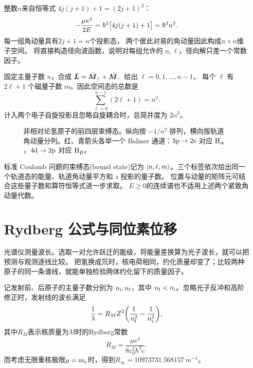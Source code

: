 整数$n$来自恒等式
$4j(j + 1) + 1 = (2j + 1)^2$：
\[
    -\frac{\mu\kappa^2}{2E}
    = \hbar^2\bigl[4j(j + 1) + 1\bigr]
    = \hbar^2n^2.
\]
每一组角动量具有$2j + 1 = n$个投影态，
两个彼此对易的角动量因此构成$n \times n$维子空间。
将直接构造径向波函数，说明对每组允许的 $n,\ell$，径向解只差一个常数因子。

\begin{corollary}[氢原子束缚能级的简并度]
固定主量子数 $n$，合成 $\hat{\bm{L}} = \hat{\bm{M}}_+ + \hat{\bm{M}}_-$ 给出 $\ell = 0,1,\ldots,n - 1$，
每个 $\ell$ 有 $2\ell + 1$ 个磁量子数 $m$。因此空间态的总数是
\begin{equation}
    \sum_{\ell=0}^{n-1}(2\ell + 1) = n^2.
\end{equation}
计入两个电子自旋投影且忽略自旋耦合时，总简并度为 $2n^2$。
\end{corollary}
\begin{figure}[htbp]
    \centering{}
    \caption{非相对论氢原子的前四层束缚态。纵向按 $-1/n^2$ 排列，横向按轨道角动量分列。红、青箭头各举一个 Balmer 通道：$3\mathrm{p} \to 2\mathrm{s}$ 对应 $\mathrm{H}_\upalpha$，$4\mathrm{d} \to 2\mathrm{p}$ 对应 $\mathrm{H}_\upbeta$。}\label{fig:hydrogen-levels}
\end{figure}
标准 Coulomb 问题的束缚态(bound state)记为 $\lvert n,\ell,m\rangle$。三个标签依次给出同一个轨道态的能量、轨道角动量平方和 $z$ 投影的量子数。
位置与动量的矩阵元可结合这些量子数和算符恒等式进一步求取。
$E \geq 0$的连续谱也不适用上述两个紧致角动量代数。

\section{Rydberg 公式与同位素位移}
\label{sec:qm-rydberg-lines}
光谱仪测量波长。选取一对允许跃迁的能级，将能量差换算为光子波长，就可以把预测与观测逐线比较。
把氢换成氘时，核电荷相同，约化质量却变了；比较两种原子的同一条谱线，就能单独检验两体约化留下的质量因子。

记发射前、后原子的主量子数分别为 $n_\mathrm i,n_\mathrm f$，其中 $n_\mathrm f < n_\mathrm i$。忽略光子反冲和高阶修正时，发射线的波长满足
\begin{equation}
    \frac1\lambda = R_MZ^2\biggl(\frac1{n_\mathrm f^2} - \frac1{n_\mathrm i^2}\biggr),
\end{equation}
其中$R_M$表示核质量为$M$时的Rydberg常数
\begin{equation}
    R_M = \frac{\mu e^4}{8\varepsilon_0^2h^3c}.
\end{equation}
而考虑无限重核极限$\mu = m_{\mathrm{e}}$时，得到$R_\infty = \qty{10973731.568157}{m^{-1}}$。

